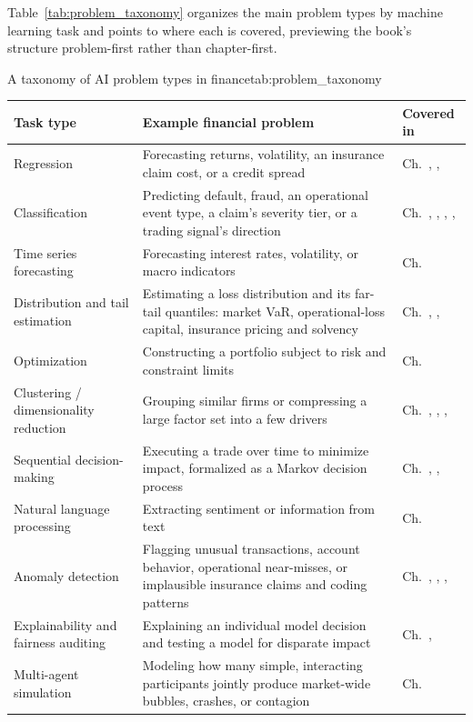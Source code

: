 \documentclass[../ai_in_finance]{subfiles}
\begin{document}
Table~\ref{tab:problem_taxonomy} organizes the main problem types by machine learning task and points to where each is covered, previewing the book's structure problem-first rather than chapter-first.

\begin{booktable}[htbp]{A taxonomy of AI problem types in finance}{tab:problem_taxonomy}
\small
\begin{tabular}{L{2.6cm}L{6.0cm}L{2.4cm}}
\toprule
Task type & Example financial problem & Covered in \\
\midrule
Regression & Forecasting returns, volatility, an insurance claim cost, or a credit spread & Ch.~, ,  \\
Classification & Predicting default, fraud, an operational event type, a claim's severity tier, or a trading signal's direction & Ch.~, , , ,  \\
Time series forecasting & Forecasting interest rates, volatility, or macro indicators & Ch.~ \\
Distribution and tail estimation & Estimating a loss distribution and its far-tail quantiles: market VaR, operational-loss capital, insurance pricing and solvency & Ch.~, ,  \\
Optimization & Constructing a portfolio subject to risk and constraint limits & Ch.~ \\
Clustering / dimensionality reduction & Grouping similar firms or compressing a large factor set into a few drivers & Ch.~, , ,  \\
Sequential decision-making & Executing a trade over time to minimize impact, formalized as a Markov decision process & Ch.~, ,  \\
Natural language processing & Extracting sentiment or information from text & Ch.~ \\
Anomaly detection & Flagging unusual transactions, account behavior, operational near-misses, or implausible insurance claims and coding patterns & Ch.~, , ,  \\
Explainability and fairness auditing & Explaining an individual model decision and testing a model for disparate impact & Ch.~,  \\
Multi-agent simulation & Modeling how many simple, interacting participants jointly produce market-wide bubbles, crashes, or contagion & Ch.~ \\
\bottomrule
\end{tabular}
\end{booktable}
\end{document}
